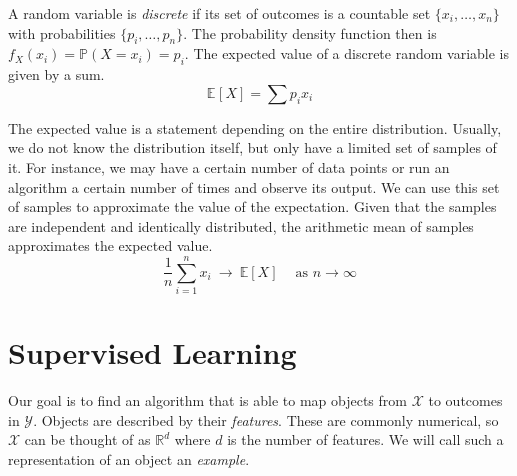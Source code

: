 \documentclass[
    a4paper, %
	fontsize=10pt, %
	twoside=false, %
]{kaobook}
\begin{document}
\begin{titlepage}


A random variable is \textit{discrete} if its set of outcomes is a countable set $\{ x_{i}, \dots, x_{n} \}$ with probabilities $\{ p_{i}, \dots, p_{n} \}$. The probability density function then is $f_X(x_i) = \mathbb{P}(X = x_i) = p_i$. The expected value of a discrete random variable is given by a sum.
$$
\mathbb{E}_{}\left[ X \right]  = \sum p_{i} x_{i}
$$

The expected value is a statement depending on the entire distribution. Usually, we do not know the distribution itself, but only have a limited set of samples of it. For instance, we may have a certain number of data points or run an algorithm a certain number of times and observe its output. We can use this set of samples to approximate the value of the expectation. Given that the samples are independent and identically distributed, the arithmetic mean of samples approximates the expected value.
$$
\frac{1}{n} \sum_{i=1}^n x_i ~ \rightarrow ~ \mathbb{E}\left[X\right]  ~ \hspace{1em} \text{as $n \to \infty$}
$$


\section{Supervised Learning}
\label{sec:supervised-learning}

Our goal is to find an algorithm that is able to map objects from $\mathcal{X}$ to outcomes in $\mathcal{Y}$. Objects
are described by their \textit{features}. These are commonly numerical, so $\mathcal{X}$ can be thought of as $\mathbb{R}^d$ where $d$ is the number of features. We will call such a representation of an object an \textit{example}.


\end{titlepage}
\end{document}
